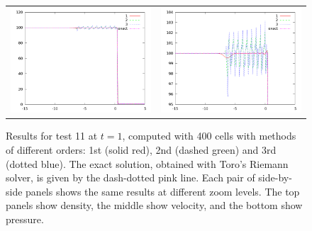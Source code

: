 \documentclass[10pt]{article}
\begin{document}
\begin{figure}[h]
\begin{center}
\begin{tabular}{cc}
      \includegraphics[width=.4\textwidth]{prs_T11.png} &	
      \includegraphics[width=.4\textwidth]{prs11zoom.png} \\
	\end{tabular}	
  \end{center}
  \caption{Results for test 11 at $t=1$, computed with 400 cells with methods of different orders: 1st (solid red), 2nd (dashed green) and 3rd (dotted blue). The exact solution, obtained with Toro's Riemann solver, is given by the dash-dotted pink line. Each pair of side-by-side panels shows the same results at different zoom levels. The top panels show density, the middle show velocity, and the bottom show pressure.}
\end{figure}
\end{document}
